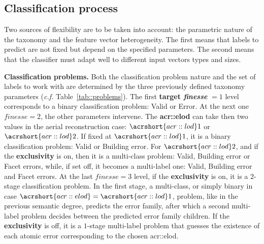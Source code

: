 \documentclass[runningheads]{llncs}
\begin{document}
\subsection{Classification process}

Two sources of flexibility are to be taken into account: the parametric nature of the taxonomy and the feature vector heterogeneity. The first means that labels to predict are not fixed but depend on the specified parameters. The second means that the classifier must adapt well to different input vectors types and sizes.

\noindent
\textbf{Classification problems.}
Both the classification problem nature and the set of labels to work with are determined by the three previously defined taxonomy parameters (\textit{c.f.} Table~\ref{tab::problems}). The first \textbf{target \textit{finesse}} $= 1$ level corresponds to a binary classification problem: Valid or Error. At the next one $\textit{finesse}=2$, the other parameters intervene. The \textbf{\acrshort{acr::elod}} can take then two values in the aerial reconstruction case: $\acrshort{acr::lod}1$ or $\acrshort{acr::lod}2$. If fixed at $\acrshort{acr::lod}1$, it is a binary classification problem: Valid or Building error. For $\acrshort{acr::lod}2$, and if the \textbf{exclusivity} is on, then it is a multi-class problem: Valid, Building error or Facet errors, while, if set off, it becomes a multi-label one: Valid, Building error and Facet errors. At the last $\textit{finesse}=3$ level, if the \textbf{exclusivity} is on, it is a $2$-stage classification problem. In the first stage, a multi-class, or simply binary in case $\acrshort{acr::elod} = \acrshort{acr::lod}1$, problem, like in the previous semantic degree, predicts the error family, after which a second multi-label problem decides between the predicted error family children. If the \textbf{exclusivity} is off, it is a $1$-stage multi-label problem that guesses the existence of each atomic error corresponding to the chosen \acrshort{acr::elod}.
\end{document}
